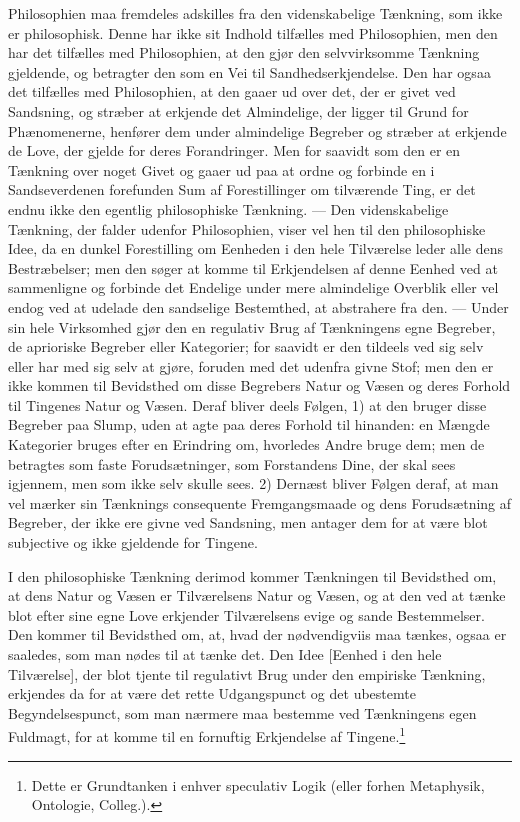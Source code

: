 \documentclass[12pt]{article}
\begin{document}
Philosophien maa fremdeles adskilles fra den videnskabelige
Tænkning, som ikke er philosophisk. Denne har ikke sit Indhold
tilfælles med Philosophien, men den har det tilfælles med
Philosophien, at den gjør den selvvirksomme Tænkning gjeldende,
og betragter den som en Vei til Sandhedserkjendelse. Den har
ogsaa det tilfælles med Philosophien, at den gaaer ud over det,
der er givet ved Sandsning, og stræber at erkjende det
Almindelige, der ligger til Grund for Phænomenerne, henfører
dem under almindelige Begreber og stræber at erkjende de Love,
der gjelde for deres Forandringer. Men for saavidt som den er
en Tænkning over noget Givet og gaaer ud paa at ordne og
forbinde en i Sandseverdenen forefunden Sum af Forestillinger
om tilværende Ting, er det endnu ikke den egentlig philosophiske
Tænkning. --- Den videnskabelige Tænkning, der falder udenfor
Philosophien, viser vel hen til den philosophiske Idee, da en
dunkel Forestilling om Eenheden i den hele Tilværelse leder
alle dens Bestræbelser; men den søger at komme til
Erkjendelsen af denne Eenhed ved at sammenligne og forbinde
det Endelige under mere almindelige Overblik eller vel endog
ved at udelade den sandselige Bestemthed, at abstrahere fra
den. --- Under sin hele Virksomhed gjør den en regulativ Brug
af Tænkningens egne Begreber, de aprioriske Begreber eller
Kategorier; for saavidt er den tildeels ved sig selv eller
har med sig selv at gjøre, foruden med det udenfra givne
Stof; men den er ikke kommen til Bevidsthed om disse Begrebers
Natur og Væsen og deres Forhold til Tingenes Natur og Væsen.
Deraf bliver deels Følgen, 1) at den bruger disse Begreber
paa Slump, uden at agte paa deres Forhold til hinanden: en
Mængde Kategorier bruges efter en Erindring om, hvorledes
Andre bruge dem; men de betragtes som faste Forudsætninger,
som Forstandens Dine, der skal sees igjennem, men som ikke
selv skulle sees. 2) Dernæst bliver Følgen deraf, at man vel
mærker sin Tænknings consequente Fremgangsmaade og dens
Forudsætning af Begreber, der ikke ere givne ved Sandsning,
men antager dem for at være blot subjective og ikke gjeldende
for Tingene.

I den philosophiske Tænkning derimod kommer Tænkningen til
Bevidsthed om, at dens Natur og Væsen er Tilværelsens Natur
og Væsen, og at den ved at tænke blot efter sine egne Love
erkjender Tilværelsens evige og sande Bestemmelser. Den
kommer til Bevidsthed om, at, hvad der nødvendigviis maa
tænkes, ogsaa er saaledes, som man nødes til at tænke det.
Den Idee [Eenhed i den hele Tilværelse], der blot tjente til
regulativt Brug under den empiriske Tænkning, erkjendes da
for at være det rette Udgangspunct og det ubestemte
Begyndelsespunct, som man nærmere maa bestemme ved
Tænkningens egen Fuldmagt, for at komme til en fornuftig
Erkjendelse af Tingene.\footnote{Dette er Grundtanken i
  enhver speculativ Logik (eller forhen Metaphysik, Ontologie,
  Colleg.).}
\end{document}
